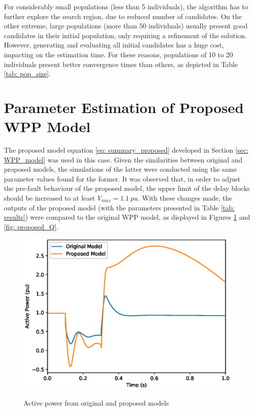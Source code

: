 For considerably small populations (less than 5 individuals), the algorithm has to further explore the search region, due to reduced number of candidates. On the other extreme, large populations (more than 50 individuals) usually present good candidates in their initial population, only requiring a refinement of the solution. However, generating and evaluating all initial candidates has a huge cost, impacting on the estimation time. For these reasons, populations of 10 to 20 individuals present better convergence times than others, as depicted in Table \ref{tab: pop_size}.

\section{Parameter Estimation of Proposed WPP Model}

The proposed model equation \eqref{eq: summary_proposed} developed in Section \ref{sec: WPP_model} was used in this case. Given the similarities between original and proposed models, the simulations of the latter were conducted using the same parameter values found for the former. It was observed that, in order to adjust the pre-fault behaviour of the proposed model, the upper limit of the delay blocks should be increased to at least $V_{max} = 1.1\ pu$. With these changes made, the outputs of the proposed model (with the parameters presented in Table \ref{tab: results}) were compared to the original WPP model, as displayed in Figures \ref{fig: proposed_P} and \ref{fig: proposed_Q}.

\begin{figure}[!h]
	\centering
	\caption{Active power from original and proposed models}
	\includegraphics[scale=.7]{Images/P_proposed.eps}
	\label{fig: proposed_P}
\end{figure}

